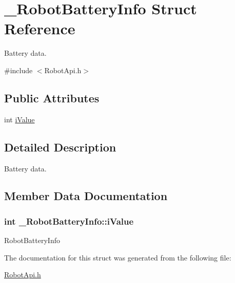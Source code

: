 \hypertarget{struct__RobotBatteryInfo}{\section{\-\_\-\-Robot\-Battery\-Info Struct Reference}
\label{struct__RobotBatteryInfo}
}


Battery data.  




{\ttfamily \#include $<$Robot\-Api.\-h$>$}

\subsection*{Public Attributes}
\begin{DoxyCompactItemize}
\item 
int \hyperlink{struct__RobotBatteryInfo_a7b54314dbf8b141f72d38bcdf1ae3bca}{i\-Value}
\end{DoxyCompactItemize}


\subsection{Detailed Description}
Battery data. 

\subsection{Member Data Documentation}
\hypertarget{struct__RobotBatteryInfo_a7b54314dbf8b141f72d38bcdf1ae3bca}{
\subsubsection[{i\-Value}]{\setlength{\rightskip}{0pt plus 5cm}int \-\_\-\-Robot\-Battery\-Info\-::i\-Value}}\label{struct__RobotBatteryInfo_a7b54314dbf8b141f72d38bcdf1ae3bca}
Robot\-Battery\-Info 

The documentation for this struct was generated from the following file\-:\begin{DoxyCompactItemize}
\item 
\hyperlink{RobotApi_8h}{Robot\-Api.\-h}\end{DoxyCompactItemize}
